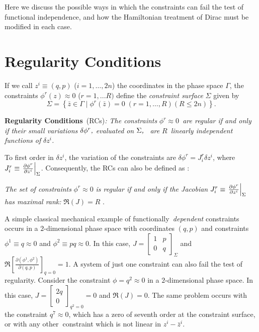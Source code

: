 \documentclass[a4paper,thmsa,11pt]{article}
\begin{document}
Here we discuss the possible ways in which the constraints can fail the test
of functional independence, and how the Hamiltonian treatment of Dirac must
be modified in each case.


\section{Regularity Conditions}

If we call $z^{i}\equiv (q,p)$ ($i=1,\ldots ,2n$) the coordinates in the
phase space $\Gamma $, the constraints $\phi ^{r}(z)\approx 0$ ($r=1,...R)$
define the \emph{constraint surface} $\Sigma $ given by
\begin{equation}
\Sigma =\left\{ \bar{z}\in \Gamma \mid \phi ^{r}(\bar{z})=0\;\left(
r=1,\ldots ,R\right) \left( R\leq 2n\right) \right\} .
\end{equation}

\textbf{Regularity Conditions}\emph{\ }(RCs)\emph{: The constraints }$\phi
^{r}\approx 0$\emph{\ are regular if and only if their small variations }$%
\delta \phi ^{r}\emph{,}$ \emph{evaluated} \emph{on }$\Sigma \emph{,}$\emph{%
\ are }$R$\emph{\ linearly independent functions of }$\delta z^{i}$\emph{.}%
\medskip

To first order in $\delta z^{i}$, the variation of the constraints are $%
\delta \phi ^{r}=J_{i}^{r}\delta z^{i}$, where $J_{i}^{r}\equiv \left. \frac{%
\partial \phi ^{r}}{\partial z^{i}}\right| _{\Sigma }$. Consequently, the
RCs can also be defined as \cite{Henneaux-Teitelboim}:\medskip

\emph{The set of constraints }$\phi ^{r}\approx 0$ \emph{is regular if and
only if the Jacobian }$J_{i}^{r}\equiv \left. \frac{\partial \phi ^{r}}{%
\partial z^{i}}\right| _{\Sigma }$ \emph{has maximal rank: }$\Re (J)=R$%
.\medskip

A simple classical mechanical example of functionally\emph{\ dependent}
constraints occurs in a $2$-dimensional phase space with coordinates $\left(
q,p\right) $ and constraints $\phi ^{1}\equiv q\approx 0$ and $\phi
^{2}\equiv pq\approx 0$. In this case, $J=\left[
\begin{array}{ll}
1 & p \\
0 & q
\end{array}
\right] _{\Sigma }$ and $\Re \left[ \frac{\partial \left( \phi ^{1},\phi
^{2}\right) }{\partial \left( q,p\right) }\right] _{q=0}=1$. A system of
just one constraint can also fail the test of regularity. Consider the
constraint $\phi =q^{2}\approx 0$ in a $2$-dimensional phase space. In this
case, $J=\left[
\begin{array}{l}
2q \\
0
\end{array}
\right] _{q^{2}=0}=0$ and $\Re \left( J\right) =0$. The same problem occurs
with the constraint $q^{7}\approx 0$, which has a zero of seventh order at
the constraint surface, or with any other\textbf{\ }constraint which is not
linear in $z^{i}-\bar{z}^{i}$.
\end{document}
